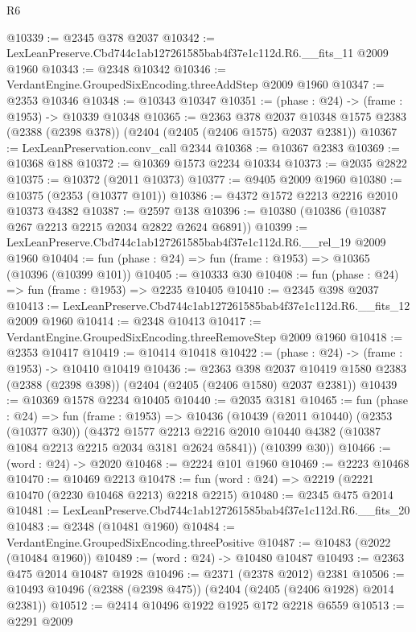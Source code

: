 \begin{lexlean}{R6}
\begin{coremodule}
@10339 := @2345 @378 @2037
@10342 := LexLeanPreserve.Cbd744c1ab127261585bab4f37e1c112d.R6.__fits_11 @2009 @1960
@10343 := @2348 @10342
@10346 := VerdantEngine.GroupedSixEncoding.threeAddStep @2009 @1960
@10347 := @2353 @10346
@10348 := @10343 @10347
@10351 := (phase : @24) -> (frame : @1953) -> @10339 @10348
@10365 := @2363
    @378
    @2037
    @10348
    @1575
    @2383
    (@2388 (@2398 @378))
    (@2404 (@2405 (@2406 @1575) @2037 @2381))
@10367 := LexLeanPreservation.conv_call @2344
@10368 := @10367 @2383
@10369 := @10368 @188
@10372 := @10369 @1573 @2234 @10334
@10373 := @2035 @2822
@10375 := @10372 (@2011 @10373)
@10377 := @9405 @2009 @1960
@10380 := @10375 (@2353 (@10377 @101))
@10386 := @4372 @1572 @2213 @2216 @2010 @10373 @4382
@10387 := @2597 @138
@10396 := @10380 (@10386 (@10387 @267 @2213 @2215 @2034 @2822 @2624 @6891))
@10399 := LexLeanPreserve.Cbd744c1ab127261585bab4f37e1c112d.R6.__rel_19 @2009 @1960
@10404 := fun (phase : @24) => fun (frame : @1953) => @10365 (@10396 (@10399 @101))
@10405 := @10333 @30
@10408 := fun (phase : @24) => fun (frame : @1953) => @2235 @10405
@10410 := @2345 @398 @2037
@10413 := LexLeanPreserve.Cbd744c1ab127261585bab4f37e1c112d.R6.__fits_12 @2009 @1960
@10414 := @2348 @10413
@10417 := VerdantEngine.GroupedSixEncoding.threeRemoveStep @2009 @1960
@10418 := @2353 @10417
@10419 := @10414 @10418
@10422 := (phase : @24) -> (frame : @1953) -> @10410 @10419
@10436 := @2363
    @398
    @2037
    @10419
    @1580
    @2383
    (@2388 (@2398 @398))
    (@2404 (@2405 (@2406 @1580) @2037 @2381))
@10439 := @10369 @1578 @2234 @10405
@10440 := @2035 @3181
@10465 := fun (phase : @24) =>
  fun (frame : @1953) =>
  @10436
    (@10439
      (@2011 @10440)
      (@2353 (@10377 @30))
      (@4372
        @1577
        @2213
        @2216
        @2010
        @10440
        @4382
        (@10387 @1084 @2213 @2215 @2034 @3181 @2624 @5841))
      (@10399 @30))
@10466 := (word : @24) -> @2020
@10468 := @2224 @101 @1960
@10469 := @2223 @10468
@10470 := @10469 @2213
@10478 := fun (word : @24) => @2219 (@2221 @10470 (@2230 @10468 @2213) @2218 @2215)
@10480 := @2345 @475 @2014
@10481 := LexLeanPreserve.Cbd744c1ab127261585bab4f37e1c112d.R6.__fits_20
@10483 := @2348 (@10481 @1960)
@10484 := VerdantEngine.GroupedSixEncoding.threePositive
@10487 := @10483 (@2022 (@10484 @1960))
@10489 := (word : @24) -> @10480 @10487
@10493 := @2363 @475 @2014 @10487 @1928
@10496 := @2371 (@2378 @2012) @2381
@10506 := @10493 @10496 (@2388 (@2398 @475)) (@2404 (@2405 (@2406 @1928) @2014 @2381))
@10512 := @2414 @10496 @1922 @1925 @172 @2218 @6559
@10513 := @2291 @2009

\end{coremodule}
\end{lexlean}
